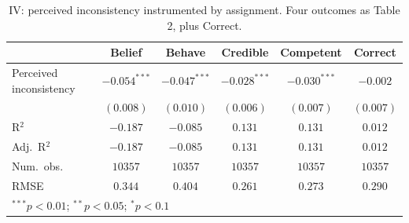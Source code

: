 
\begin{table}
\begin{center}
\begin{tabular}{l c c || c c || c}
\hline
 & Belief & Behave & Credible & Competent & Correct \\
\hline
Perceived inconsistency & $-0.054^{***}$ & $-0.047^{***}$ & $-0.028^{***}$ & $-0.030^{***}$ & $-0.002$  \\
                        & $(0.008)$      & $(0.010)$      & $(0.006)$      & $(0.007)$      & $(0.007)$ \\
\hline
R$^2$                   & $-0.187$       & $-0.085$       & $0.131$        & $0.131$        & $0.012$   \\
Adj.\ R$^2$             & $-0.187$       & $-0.085$       & $0.131$        & $0.131$        & $0.012$   \\
Num.\ obs.              & $10357$        & $10357$        & $10357$        & $10357$        & $10357$   \\
RMSE                    & $0.344$        & $0.404$        & $0.261$        & $0.273$        & $0.290$   \\
\hline
\multicolumn{6}{l}{\scriptsize{$^{***}p<0.01$; $^{**}p<0.05$; $^{*}p<0.1$}}
\end{tabular}
\caption{IV: perceived inconsistency instrumented by assignment. Four outcomes as Table 2, plus Correct.}
\label{table:iv}
\end{center}
\end{table}

